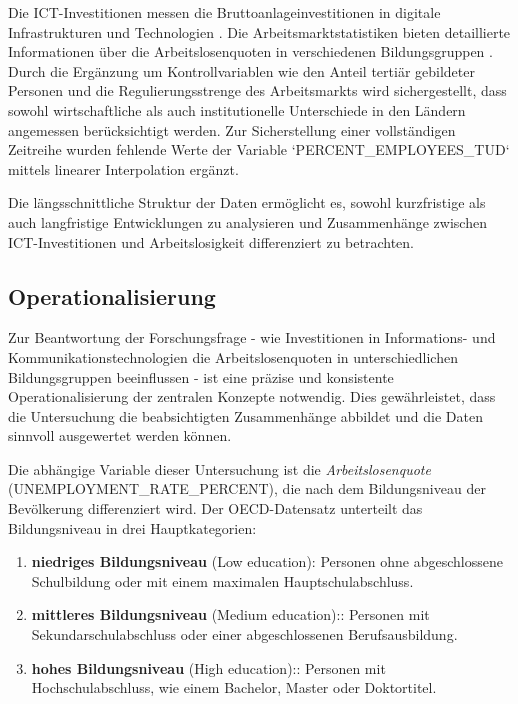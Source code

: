 Die \ac{ICT}-Investitionen messen die Bruttoanlageinvestitionen in digitale Infrastrukturen 
und Technologien \parencite{oecd2022ict}. Die Arbeitsmarktstatistiken bieten detaillierte 
Informationen über die Arbeitslosenquoten in verschiedenen Bildungsgruppen 
\parencite{oecd2022unemployment}. Durch die Ergänzung um Kontrollvariablen wie den Anteil 
tertiär gebildeter Personen und die Regulierungsstrenge des Arbeitsmarkts wird sichergestellt, 
dass sowohl wirtschaftliche als auch institutionelle Unterschiede in den Ländern angemessen 
berücksichtigt werden. Zur Sicherstellung einer vollständigen Zeitreihe wurden fehlende Werte 
der Variable `PERCENT\_EMPLOYEES\_TUD` mittels linearer Interpolation ergänzt.  

Die längsschnittliche Struktur der Daten ermöglicht es, sowohl kurzfristige als auch 
langfristige Entwicklungen zu analysieren und Zusammenhänge zwischen ICT-Investitionen und 
Arbeitslosigkeit differenziert zu betrachten.



\subsection{Operationalisierung}

Zur Beantwortung der Forschungsfrage - wie Investitionen in Informations- und 
Kommunikationstechnologien die Arbeitslosenquoten in unterschiedlichen Bildungsgruppen 
beeinflussen - ist eine präzise und konsistente Operationalisierung der zentralen Konzepte 
notwendig. Dies gewährleistet, dass die Untersuchung die beabsichtigten Zusammenhänge abbildet 
und die Daten sinnvoll ausgewertet werden können.

Die abhängige Variable dieser Untersuchung ist die \textit{Arbeitslosenquote} 
(UNEMPLOYMENT\_RATE\_PERCENT), die nach dem Bildungsniveau der Bevölkerung differenziert wird. 
Der \ac{OECD}-Datensatz unterteilt das Bildungsniveau in drei Hauptkategorien:

\begin{enumerate}
    \item \textbf{niedriges Bildungsniveau} (Low education): Personen ohne abgeschlossene 
    Schulbildung oder mit einem maximalen Hauptschulabschluss.
    \item \textbf{mittleres Bildungsniveau} (Medium education):: Personen mit 
    Sekundarschulabschluss oder einer abgeschlossenen Berufsausbildung.
    \item \textbf{hohes Bildungsniveau} (High education):: Personen mit Hochschulabschluss, wie 
    einem Bachelor, Master oder Doktortitel.
\end{enumerate}

